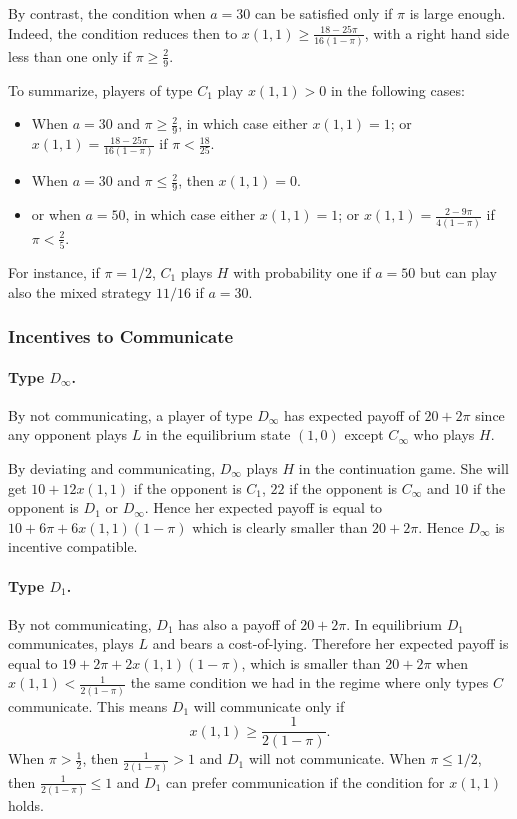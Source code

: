 \documentclass[12pt]{article}
\theoremstyle{definition}
\theoremstyle{remark}
\begin{document}
By contrast, the condition when $a=30$ can be satisfied only if  $\pi$ is large enough. Indeed, the condition reduces then to $x(1,1)\geq \frac{18-25\pi}{16(1-\pi)}$, with a right hand side less than one only if $\pi\geq \frac{2}{9}$.

To summarize, players of type $C_1$ play $x(1,1)>0$ in the following cases:
\begin{itemize}
    \item When $a=30$ and $\pi\geq \frac{2}{9}$, in which case either $x(1,1)=1$; or $x(1,1)=\frac{18-25\pi}{16(1-\pi)}$ if $\pi<\frac{18}{25}$.
    \item When $a=30$ and $\pi\leq \frac{2}{9}$, then $x(1,1)=0$.
    \item or when $a=50$, in which case either $x(1,1)=1$; or $x(1,1)=\frac{2-9\pi}{4(1-\pi)}$ if $\pi<\frac{2}{5}$.
\end{itemize}
%
For instance, if $\pi=1/2$,  $C_1$ plays $H$ with probability one if $a=50$ but can play also the mixed strategy $11/16$ if $a=30$. 

\subsubsection*{Incentives to Communicate}
\paragraph{Type $D_\infty$.} By not communicating, a player of type $D_\infty$ has expected payoff of $20+2\pi$ since any opponent plays $L$ in the equilibrium state $(1,0)$ except $C_\infty$ who plays $H$.

By deviating and communicating, $D_\infty$ plays $H$ in the continuation game. She will get $10+12x(1,1)$ if the opponent is $C_1$, $22$ if the opponent is $C_\infty$ and $10$ if the opponent is $D_1$ or $D_\infty$. Hence her expected payoff is equal to $10+6\pi+6x(1,1)(1-\pi)$ which is clearly smaller than $20+2\pi$. Hence $D_\infty$ is incentive compatible.

\paragraph{Type $D_1$.} By not communicating, $D_1$ has also a payoff of $20+2\pi$. In equilibrium $D_1$ communicates, plays $L$ and bears a cost-of-lying. Therefore her expected payoff is equal to $19+2\pi+2x(1,1)(1-\pi)$, which is smaller than $20+2\pi$ when $x(1,1) < \frac{1}{2(1-\pi)}$
the same condition we had in the regime where only types $C$ communicate. This means $D_1$ will communicate only if 
\[
x(1,1)\geq \frac{1}{2(1-\pi)}.
\]
When $\pi>\frac{1}{2}$, then $\frac{1}{2(1-\pi)}>1$ and $D_1$ will not communicate. When $\pi\leq 1/2$, then $\frac{1}{2(1-\pi)}\leq 1$ and $D_1$ can prefer communication if the condition for $x(1,1)$ holds.
\end{document}

